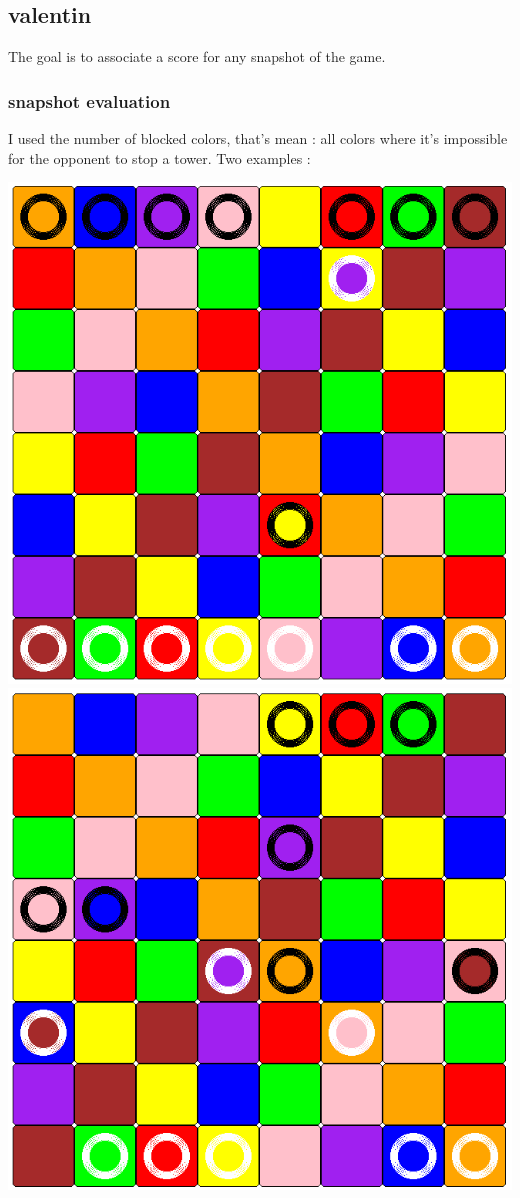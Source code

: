 \documentclass[a4paper, 11pt]{article}
\begin{document}
\newpage
\subsection{valentin}
The goal is to associate a score for any snapshot of the game.

\subsubsection{snapshot evaluation}
I used the number of blocked colors, that's mean : all colors where it's impossible for the opponent to stop a tower. Two examples :\\
\begin{center}
\includegraphics[scale = 0.30]{val1.png}
\includegraphics[scale = 0.30]{val2.png}
\end{center}
\end{document}
